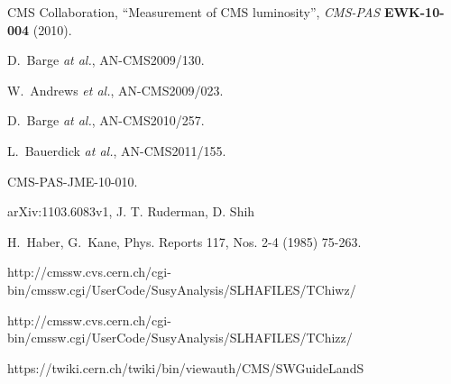 \begin{thebibliography}{10}
{CMS Collaboration}, ``Measurement of CMS luminosity'', {\em CMS-PAS} {\bf
  EWK-10-004} (2010).

 D.~Barge {\em at al.}, AN-CMS2009/130.

 W.~Andrews {\em et al.}, AN-CMS2009/023.

 D.~Barge {\em at al.}, AN-CMS2010/257.

 L.~Bauerdick {\em at al.}, AN-CMS2011/155.

 CMS-PAS-JME-10-010.

 arXiv:1103.6083v1, J. T. Ruderman, D. Shih

H.~Haber, G.~Kane, Phys. Reports 117, Nos. 2-4 (1985) 75-263.

 http://cmssw.cvs.cern.ch/cgi-bin/cmssw.cgi/UserCode/SusyAnalysis/SLHAFILES/TChiwz/

 http://cmssw.cvs.cern.ch/cgi-bin/cmssw.cgi/UserCode/SusyAnalysis/SLHAFILES/TChizz/

 https://twiki.cern.ch/twiki/bin/viewauth/CMS/SWGuideLandS

\end{thebibliography}
